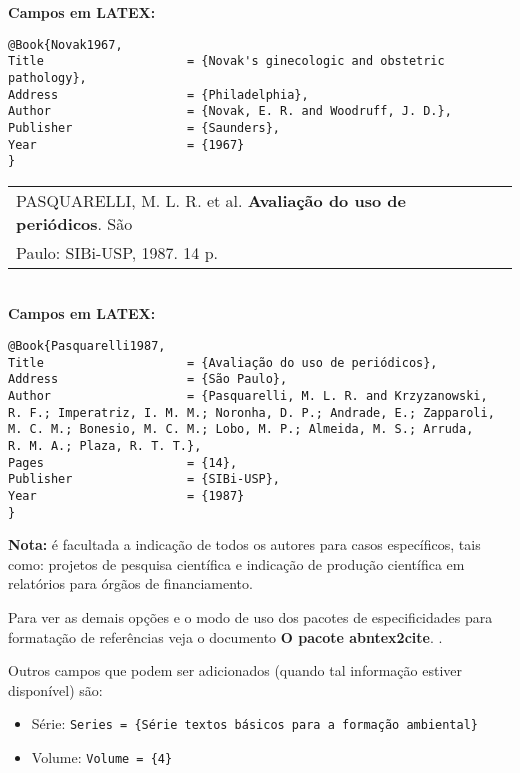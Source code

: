 \textbf{Campos em LATEX:}
\begingroup
\fontsize{10pt}{12pt}\selectfont
\begin{verbatim}
@Book{Novak1967,
Title                    = {Novak's ginecologic and obstetric 
pathology},
Address                  = {Philadelphia},
Author                   = {Novak, E. R. and Woodruff, J. D.},
Publisher                = {Saunders},
Year                     = {1967}
}
\end{verbatim}
\endgroup
	
\begin{tabular}{|l|c|} \hline
	PASQUARELLI, M. L. R. et al. \textbf{Avaliação do uso de periódicos}. 
	São                                                                     \\ Paulo: SIBi-USP, 1987. 14 p.\\\hline
\end{tabular}\\
	
\textbf{Campos em LATEX:}
	
\begingroup
\fontsize{10pt}{12pt}\selectfont
\begin{verbatim}
@Book{Pasquarelli1987,
Title                    = {Avaliação do uso de periódicos},
Address                  = {São Paulo},
Author                   = {Pasquarelli, M. L. R. and Krzyzanowski,
R. F.; Imperatriz, I. M. M.; Noronha, D. P.; Andrade, E.; Zapparoli,
M. C. M.; Bonesio, M. C. M.; Lobo, M. P.; Almeida, M. S.; Arruda, 
R. M. A.; Plaza, R. T. T.},
Pages                    = {14},
Publisher                = {SIBi-USP},
Year                     = {1987}
}
\end{verbatim}
\endgroup
	
\textbf{Nota:} é facultada a indicação de todos os autores para casos específicos, tais como: projetos de pesquisa científica e indicação de
produção científica em relatórios para órgãos de financiamento. 
	
Para ver as demais opções e o modo de uso dos pacotes de especificidades para formatação de referências veja o documento \textbf{O pacote abntex2cite}. \cite{abntex2cite}.
	
Outros campos que podem ser adicionados (quando tal informação estiver disponível) são: 
	
\begin{itemize}
	\item Série: \verb!Series = {Série textos básicos para a formação ambiental}!
	\item Volume: \verb!Volume = {4}!
\end{itemize}
	
